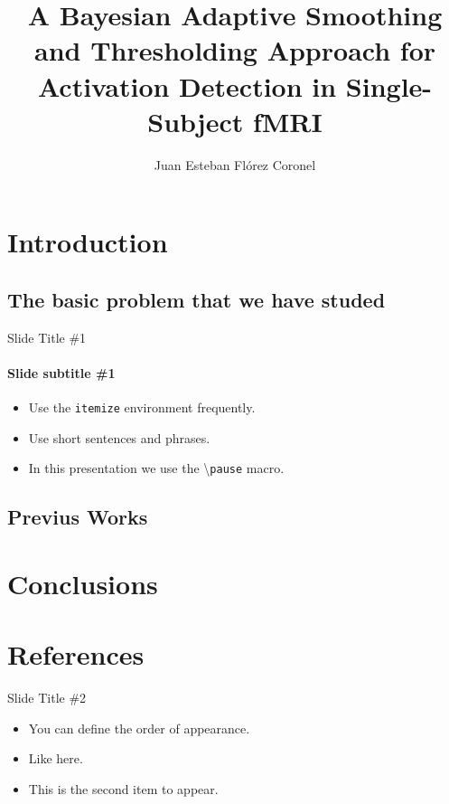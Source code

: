 \documentclass{beamer}
\title[bFAST in Single-Subject fMRI]{A Bayesian Adaptive Smoothing and 
Thresholding Approach for Activation Detection in 
Single-Subject fMRI}
\author[J. Flórez-Coronel]{Juan Esteban Flórez Coronel}
\begin{document}
\typesetFrontSlides


\section{Introduction}

\subsection[Basic Problem]{The basic problem that we have studed}

\begin{frame}{Slide Title \#1}
	\framesubtitle{Slide subtitle \#1}
	\begin{itemize}
		\item Use the \texttt{itemize} environment frequently.
		\pause
		\item Use short \cite{gorgoso2014use} sentences and phrases.
		\pause
		\item In this presentation we use the \textbackslash{}\texttt{pause} macro.
	\end{itemize}
\end{frame}

\subsection{Previus Works}

\section{Conclusions}

\section{References}

\begin{frame}{Slide Title \#2}
	\begin{itemize}
		\item <1->You can define the order of appearance.
		\item <3->Like here.
		\item <2->This is the second item to appear.
	\end{itemize}
\end{frame}
\end{document}
